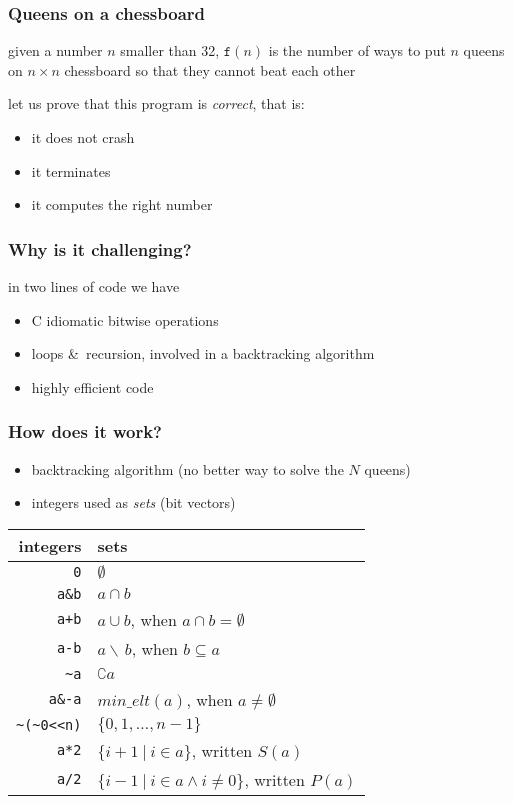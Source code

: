 \documentclass[handout,compress]{beamer}
\newcommand{\minelt}[1]{\ensuremath{\mathit{min\_elt}(#1)}}
\begin{document}
\begin{frame}
  \frametitle{Queens on a chessboard}

given a number $n$ smaller than 32, 
$\mathtt{f}(n)$ is the number of ways to put $n$ queens on $n\times n$
chessboard so that they cannot beat each other

\Pause

let us prove that this program is \emph{correct}, that is:
\begin{itemize}
\item it does not crash
\item it terminates
\item it computes the right number
\end{itemize}
\end{frame}

\begin{frame}
  \frametitle{Why is it challenging?}
  in two lines of code we have
  \begin{itemize}
  \item C idiomatic bitwise operations
  \item loops \&\ recursion, involved in a backtracking algorithm
  \item highly efficient code
  \end{itemize}
\end{frame}

\begin{frame}[fragile]
  \frametitle{How does it work?}
  \begin{itemize}
  \item backtracking algorithm (no better way to solve the $N$ queens)
  \item integers used as \emph{sets} (bit vectors)
  \end{itemize}
  \pause
  \begin{center}
    \begin{tabular}{r|l}
      integers & sets \\\hline
    \verb!0! & $\emptyset$ \\
   \verb!a&b! & $a\cap b$ \\
       \verb!a+b! & $a\cup b$, \quad when $a\cap b=\emptyset$ \\
       \verb!a-b! & $a\backslash\,b$, \quad when $b\subseteq a$ \\
     \verb!~a! & $\complement a$ \\
     \verb!a&-a! & $\minelt{a}$, \quad when $a\not=\emptyset$ \\
     \verb!~(~0<<n)! & $\{0,1,\dots,n-1\}$ \\
     \verb!a*2! & $\{i+1~|~i\in a\}$, \quad written $S(a)$ \\
     \verb!a/2! & $\{i-1~|~i\in a \land i\not=0\}$, \quad written $P(a)$ \\
    \end{tabular}
  \end{center}
\end{frame}
\end{document}
